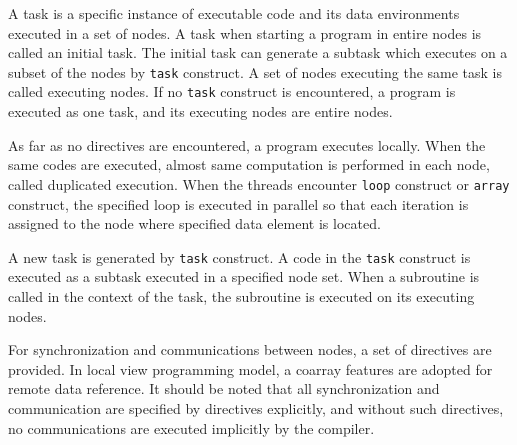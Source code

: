 A task is a specific instance of executable
code and its data environments executed in a set of nodes. A task when
starting a program in entire nodes is called an initial task. The
initial task can generate a subtask which executes on a subset of the
nodes by {\tt task} construct. A set of nodes executing the same task is
called executing nodes. If no {\tt task} construct is encountered, a
program is executed as one task, and its executing nodes are entire
nodes.

As far as no directives are encountered, a program executes
locally. When the same codes are executed, almost same computation is
performed in each node, called duplicated execution. When the threads
encounter {\tt loop} construct or {\tt array} construct, the specified
loop is executed in parallel so that each iteration is assigned to the
node where specified data element is located. 

A new task is generated by
{\tt task} construct. A code in the {\tt task} construct is executed
as a subtask executed in a specified node set. When a subroutine is
called in the context of the task, the subroutine is executed on its
executing nodes. 

For synchronization and communications between nodes, a set of
directives are provided. In local view programming model, a coarray
features are adopted for remote data reference. It should be noted
that all synchronization and communication are specified by directives
explicitly, and without such directives, no communications are
executed implicitly by the compiler.
